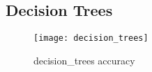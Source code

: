 
\subsection{Decision Trees}%
\label{sub:decision-trees}
\begin{figure}[H]
    \centering
    \texttt{[image: decision\_trees]}
    \caption{decision_trees accuracy}%
    \label{fig:knn_pca_lda_nca}
\end{figure}


